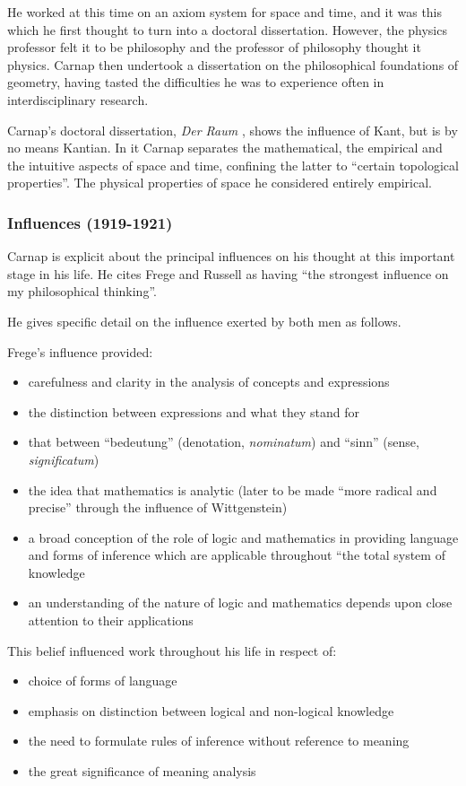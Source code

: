 \documentclass[10pt,titlepage]{book}
\begin{document}
He worked at this time on an axiom system for space and time, and it was this which he first thought to turn into a doctoral dissertation.
However, the physics professor felt it to be philosophy and the professor of philosophy thought it physics.
Carnap then undertook a dissertation on the philosophical foundations of geometry, having tasted the difficulties he was to experience often in interdisciplinary research.

Carnap's doctoral dissertation, \emph{Der Raum} \cite{carnap21}, shows the influence of Kant, but is by no means Kantian.
In it Carnap separates the mathematical, the empirical and the intuitive aspects of space and time, confining the latter to ``certain topological properties''.
The physical properties of space he considered entirely empirical.

\subsubsection{Influences (1919-1921)}

Carnap is explicit about the principal influences on his thought at this important stage in his life.
He cites Frege and Russell as having ``the strongest influence on my philosophical thinking''.

He gives specific detail on the influence exerted by both men as follows.

Frege's influence provided:
\begin{itemize}
\item carefulness and clarity in the analysis of concepts and expressions
\item the distinction between expressions and what they stand for
\item that between ``bedeutung'' (denotation, \emph{nominatum}) and ``sinn'' (sense, \emph{significatum})
\item the idea that mathematics is analytic (later to be made ``more radical and precise'' through the influence of Wittgenstein)
\item a broad conception of the role of logic and mathematics in providing language and forms of inference which are applicable throughout ``the total system of knowledge
\item an understanding of the nature of logic and mathematics depends upon close attention to their applications
\end{itemize}

This belief influenced work throughout his life in respect of:
\begin{itemize}
\item choice of forms of language
\item emphasis on distinction between logical and non-logical knowledge
\item the need to formulate rules of inference without reference to meaning
\item the great significance of meaning analysis
\end{itemize}
\end{document}
